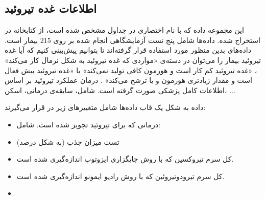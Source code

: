 \subsection{
اطلاعات غده تیروئید
}

این مجموعه داده که با نام اختصاری 
در جداول مشخص شده است، از کتابخانه
\cite{rmclust}
در 
استخراج شده. داده‌ها شامل پنج تست آزمایشگاهی انجام شده بر روی 215 بیمار است. داده‌های بدین منظور مورد استفاده قرار گرفته‌اند تا بتوانیم پیش‌بینی کنیم که آیا غده تیروئید بیمار را می‌توان در دسته‌ی «مواردی که غده تیروئید به شکل نرمال کار می‌کند»
، «غده تیروئید کم کار است و هورمون کافی تولید نمی‌کند»
یا «غده تیروئید بیش فعال است و مقدار زیادتری هورمون 
و یا
ترشح می‌کند»
. درمان عملکرد تیروئید بر اساس اطلاعات کامل پزشکی صورت گرفته است. شامل، سابقه‌ی درمانی، اسکن، ...

داده به شکل یک قاب دا‌ده‌ها
شامل متغییر‌های زیر در 
قرار می‌گیرند:
\begin{itemize}
\item
{}
درمانی که برای تیروئید تجویز شده است. شامل:
\item
{}
تست میزان جذب 
(به شکل درصد)
\item
{}
کل سرم تیروکسین که با روش جایگزاری ایزوتوپ
اندازه‌گیری شده است.
\item
{}
کل سرم تیرودوتیروئین 
که با روش رادیو ایمونو
اندازه‌گیری شده است.
\item
{}
\end{itemize}
